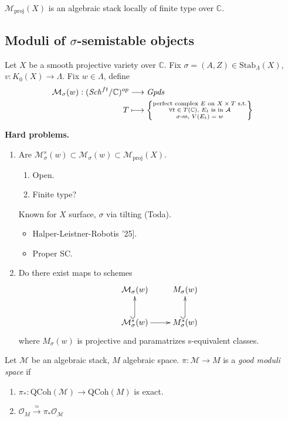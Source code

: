 \begin{theorem}[Lieblich]
\label{theorem-Lieblich}
$\mathcal{M}_{\text{proj}}(X)$ is an
algebraic stack locally of finite type over
$\mathbb{C}$.
\end{theorem}

\subsection{Moduli of $\sigma$-semistable
objects}
\label{nasak-label-007}

Let $X$ be a smooth projective variety over
$\mathbb{C}$. Fix
$\sigma=(A,Z)\in\text{Stab}_{\Lambda}(X)$,
$v:K_0(X) \to \Lambda$. Fix $w \in
\Lambda$, define
$$
\begin{aligned}
\mathcal{M}_{\sigma}(w):(\mathit{Sch}^{ft}/\mathbb{C}
)
^{op}
&\longrightarrow  \mathit{Gpds} \\
T &\longmapsto \left\{
\substack{\text{perfect complex $E$ on
$X\times T$ s.t.}
\\ \text{$\forall t \in T(\mathbb{C})$, $E_t$
is in $\mathcal{A}$}\\
\text{$\sigma$-ss, $V(E_t)=w$}} \right\}
\end{aligned}
$$

\medskip\noindent
{\bf Hard problems.}
\begin{enumerate}
\item Are $\mathcal{M}_{\sigma}^s(w) \subset
\mathcal{M}_{\sigma}(w)
\subset \mathcal{M}_{\text{proj}}(X)$.
\begin{enumerate}
\item Open.
\item Finite type?
\end{enumerate}
Known for $X$ surface, $\sigma$ via tilting
(Toda).
\begin{itemize}
\item \text{[}Halper-Leistner-Robotis '25].
\item Proper SC.
\end{itemize}
\item Do there exist maps to schemes
$$
\xymatrix{
\mathcal{M}_{\sigma}(w)&M_\sigma(w)\\
\mathcal{M}_{\sigma}^s(w)\ar[r]\ar@{^{(}->}
[u]
&
M_{\sigma}^s(w)\ar@{^{(}->}[u]
}
$$
where $M_\sigma(w)$ is projective and
paramatrizes s-equivalent classes.
\end{enumerate}

\begin{definition}
\label{definition-good-moduli-space}
Let $\mathcal{M}$ be an algebraic stack, $M$
algebraic space. $\pi:\mathcal{M} \to M$ is a
{\it good moduli space} if
\begin{enumerate}
\item $\pi_* :\text{QCoh}(\mathcal{M}) \to
\text{QCoh}(M)$ is exact.
\item $\mathcal{O}_M \xrightarrow{\simeq
}\pi_*\mathcal{O}_{\mathcal{M}}$
\end{enumerate}
\end{definition}

